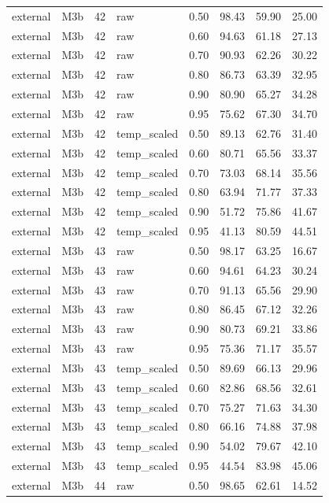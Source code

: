 \begin{tabular}{llrlrrrr}
external & M3b & 42 & raw & 0.50 & 98.43 & 59.90 & 25.00 \\
external & M3b & 42 & raw & 0.60 & 94.63 & 61.18 & 27.13 \\
external & M3b & 42 & raw & 0.70 & 90.93 & 62.26 & 30.22 \\
external & M3b & 42 & raw & 0.80 & 86.73 & 63.39 & 32.95 \\
external & M3b & 42 & raw & 0.90 & 80.90 & 65.27 & 34.28 \\
external & M3b & 42 & raw & 0.95 & 75.62 & 67.30 & 34.70 \\
external & M3b & 42 & temp\_scaled & 0.50 & 89.13 & 62.76 & 31.40 \\
external & M3b & 42 & temp\_scaled & 0.60 & 80.71 & 65.56 & 33.37 \\
external & M3b & 42 & temp\_scaled & 0.70 & 73.03 & 68.14 & 35.56 \\
external & M3b & 42 & temp\_scaled & 0.80 & 63.94 & 71.77 & 37.33 \\
external & M3b & 42 & temp\_scaled & 0.90 & 51.72 & 75.86 & 41.67 \\
external & M3b & 42 & temp\_scaled & 0.95 & 41.13 & 80.59 & 44.51 \\
external & M3b & 43 & raw & 0.50 & 98.17 & 63.25 & 16.67 \\
external & M3b & 43 & raw & 0.60 & 94.61 & 64.23 & 30.24 \\
external & M3b & 43 & raw & 0.70 & 91.13 & 65.56 & 29.90 \\
external & M3b & 43 & raw & 0.80 & 86.45 & 67.12 & 32.26 \\
external & M3b & 43 & raw & 0.90 & 80.73 & 69.21 & 33.86 \\
external & M3b & 43 & raw & 0.95 & 75.36 & 71.17 & 35.57 \\
external & M3b & 43 & temp\_scaled & 0.50 & 89.69 & 66.13 & 29.96 \\
external & M3b & 43 & temp\_scaled & 0.60 & 82.86 & 68.56 & 32.61 \\
external & M3b & 43 & temp\_scaled & 0.70 & 75.27 & 71.63 & 34.30 \\
external & M3b & 43 & temp\_scaled & 0.80 & 66.16 & 74.88 & 37.98 \\
external & M3b & 43 & temp\_scaled & 0.90 & 54.02 & 79.67 & 42.10 \\
external & M3b & 43 & temp\_scaled & 0.95 & 44.54 & 83.98 & 45.06 \\
external & M3b & 44 & raw & 0.50 & 98.65 & 62.61 & 14.52 \\

\end{tabular}
